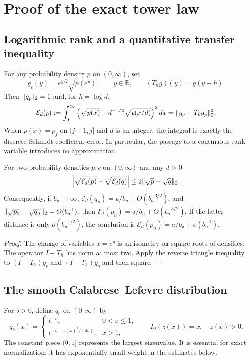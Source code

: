 \section{Proof of the exact tower law}\label{app:tower}
\subsection{Logarithmic rank and a quantitative transfer inequality}

For any probability density $p$ on $(0,\infty)$, set
\[
 g_p(y)=e^{y/2}\sqrt{p(e^y)},\qquad y\in\mathbb R,
 \qquad (T_hg)(y)=g(y-h).
\]
Then $\lVert g_p\rVert_2=1$ and, for $h=\log d$,
\begin{equation}\label{eq:exact-rank-translation}
 \mathcal E_d(p):=
 \int_0^\infty
 \left(\sqrt{p(x)}-d^{-1/2}\sqrt{p(x/d)}\right)^2dx
 =\lVert g_p-T_hg_p\rVert_2^2.
\end{equation}
When $p(x)=p_j$ on $(j-1,j]$ and $d$ is an integer, the integral is
exactly the discrete Schmidt-coefficient error.  In particular, the
passage to a continuous rank variable introduces no approximation.

\begin{lemma}\label{lem:hellinger-transfer}
For two probability densities $p,q$ on $(0,\infty)$ and any $d>0$,
\begin{equation}\label{eq:hellinger-transfer}
 \left|\sqrt{\mathcal E_d(p)}-
             \sqrt{\mathcal E_d(q)}\right|
 \leq 2\lVert \sqrt p-\sqrt q\rVert_2.
\end{equation}
Consequently, if $b_n\to\infty$,
$\mathcal E_d(q_n)=a/b_n+O(b_n^{-3/2})$, and
$\lVert \sqrt{p_n}-\sqrt{q_n}\rVert_2=O(b_n^{-1})$, then
$\mathcal E_d(p_n)=a/b_n+O(b_n^{-3/2})$.
If the latter distance is only $o(b_n^{-1/2})$, the conclusion is
$\mathcal E_d(p_n)=a/b_n+o(b_n^{-1})$.
\end{lemma}

\begin{proof}
The change of variables $x=e^y$ is an isometry on square roots of
densities.  The operator $I-T_h$ has norm at most two.  Apply the reverse
triangle inequality to $(I-T_h)g_p$ and $(I-T_h)g_q$ and then square.
\end{proof}

\subsection{The smooth Calabrese--Lefevre distribution}

For $b>0$, define $q_b$ on $(0,\infty)$ by
\begin{equation}\label{eq:CL-density-exact}
 q_b(x)=
 \begin{cases}
 e^{-b},&0<x\leq1,\\
 \displaystyle e^{-b-z(x)^2/(4b)},&x>1,
 \end{cases}
 \qquad I_0(z(x))=x,\quad z(x)>0.
\end{equation}
The constant piece $(0,1]$ represents the largest eigenvalue.  It is
essential for exact normalization; it has exponentially small weight
in the estimates below.

